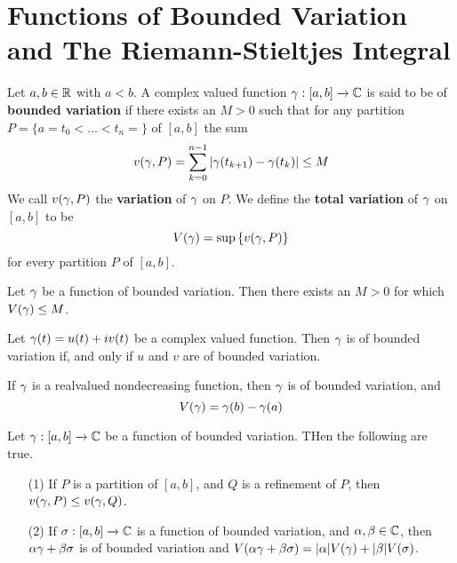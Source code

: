 \section{Functions of Bounded Variation and The Riemann-Stieltjes Integral}

\begin{definition}
    Let $a,b \in \mathbb{R}$ with  $a<b$. A complex valued function $\gamma:[a,b]
    \xrightarrow{} \mathbb{C}$ is said to be of \textbf{bounded variation} if there
    exists an $M>0$ such that for any partition $P=\{a=t_0<\dots<t_n=\}$ of
    $[a,b]$ the sum
    \begin{equation*}
        v(\gamma,P)=\sum_{k=0}^{n-1}{|\gamma(t_{k+1})-\gamma(t_k)|} \leq M
    \end{equation*}
    We call $v(\gamma,P)$ the \textbf{variation} of $\gamma$ on  $P$. We define the
     \textbf{total variation} of $\gamma$ on  $[a,b]$ to be
     \begin{equation*}
         V(\gamma)=\sup{\{v(\gamma,P)\}}
     \end{equation*}
     for every partition $P$ of  $[a,b]$.
\end{definition}

\begin{lemma}\label{4.1.1}
    Let $\gamma$ be a function of bounded variation. Then there exists an  $M>0$
    for which  $V(\gamma) \leq M$.
\end{lemma}

\begin{lemma}\label{4.1.2}
    Let $\gamma(t)=u(t)+iv(t)$ be a complex valued function. Then $\gamma$ is of bounded
    variation if, and only if $u$ and $v$ are of bounded variation.
\end{lemma}

\begin{lemma}\label{4.1.3}
    If $\gamma$ is a realvalued nondecreasing function, then  $\gamma$ is of bounded
    variation, and
    \begin{equation*}
        V(\gamma)=\gamma(b)-\gamma(a)
    \end{equation*}
\end{lemma}

\begin{lemma}\label{4.1.4}
    Let $\gamma:[a,b] \xrightarrow{} \mathbb{C}$ be a function of bounded variation. THen
    the following are true.
    \begin{enumerate}
        \item[(1)] If $P$ is a partition of  $[a,b]$, and $Q$ is a refinement of
             $P$, then  $v(\gamma,P) \leq v(\gamma,Q)$.

         \item[(2)] If $\sigma:[a,b] \xrightarrow{} \mathbb{C}$ is a function of bounded
             variation, and $\alpha,\beta \in \mathbb{C}$, then  $\alpha\gamma+\beta\sigma$ is of bounded
             variation and $V(\alpha\gamma+\beta\sigma)=|\alpha|V(\gamma)+|\beta|V(\sigma)$.
    \end{enumerate}
\end{lemma}

